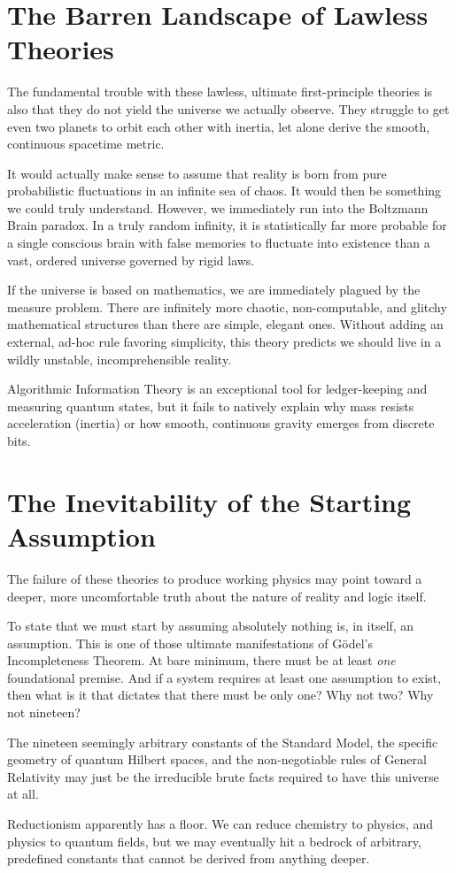 \section{The Barren Landscape of Lawless Theories}

The fundamental trouble with these lawless, ultimate first-principle theories is also that they do not yield the universe we actually observe. They struggle to get even two planets to orbit each other with inertia, let alone derive the smooth, continuous spacetime metric.

It would actually make sense to assume that reality is born from pure probabilistic fluctuations in an infinite sea of chaos.
It would then be something we could truly understand. However, we immediately run into the Boltzmann Brain paradox. In a truly random infinity, it is statistically far more probable for a single conscious brain with false memories to fluctuate into existence than a vast, ordered universe governed by rigid laws. 

If the universe is based on mathematics, we are immediately plagued by the measure problem. There are infinitely more chaotic, non-computable, and glitchy mathematical structures than there are simple, elegant ones. Without adding an external, ad-hoc rule favoring simplicity, this theory predicts we should live in a wildly unstable, incomprehensible reality. 

Algorithmic Information Theory is an exceptional tool for ledger-keeping and measuring quantum states, but it fails to natively explain why mass resists acceleration (inertia) or how smooth, continuous gravity emerges from discrete bits.


\section{The Inevitability of the Starting Assumption}

The failure of these theories to produce working physics may point toward a deeper, more uncomfortable truth about the nature of reality and logic itself. 

To state that we must start by assuming absolutely nothing is, in itself, an assumption. This is one of those ultimate manifestations of G\"odel's Incompleteness Theorem.  At bare minimum, there must be at least \textit{one} foundational premise. And if a system requires at least one assumption to exist, then what is it that dictates that there must be only one? Why not two? Why not nineteen?

The nineteen seemingly arbitrary constants of the Standard Model, the specific geometry of quantum Hilbert spaces, and the non-negotiable rules of General Relativity may just be the irreducible brute facts required to have this universe at all.

Reductionism apparently has a floor. We can reduce chemistry to physics, and physics to quantum fields, but we may eventually hit a bedrock of arbitrary, predefined constants that cannot be derived from anything deeper.


